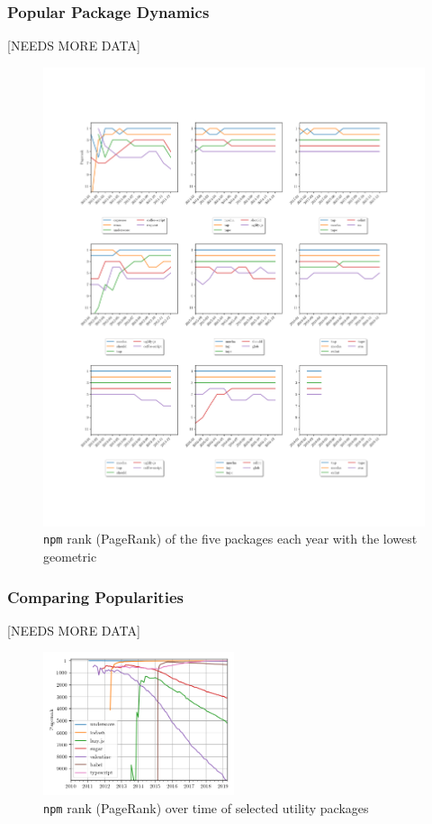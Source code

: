 \documentclass[10pt,conference]{IEEEtran}
\def\code#1{\texttt{#1}}
\begin{document}
\subsubsection{Popular Package Dynamics}
[NEEDS MORE DATA]

\begin{figure}
  \includegraphics[width=1\textwidth]{figures/highest_ranked.pdf}
  \caption{\code{npm} rank (PageRank) of the five packages each year with the lowest geometric}
  \label{ranksByYear}
\end{figure}

\subsubsection{Comparing Popularities}
[NEEDS MORE DATA]

\begin{figure}
  \includegraphics[width=0.5\textwidth]{figures/select_packages.png}
  \caption{\code{npm} rank (PageRank) over time of selected utility packages}
  \label{selectPackages}
\end{figure}
\end{document}
